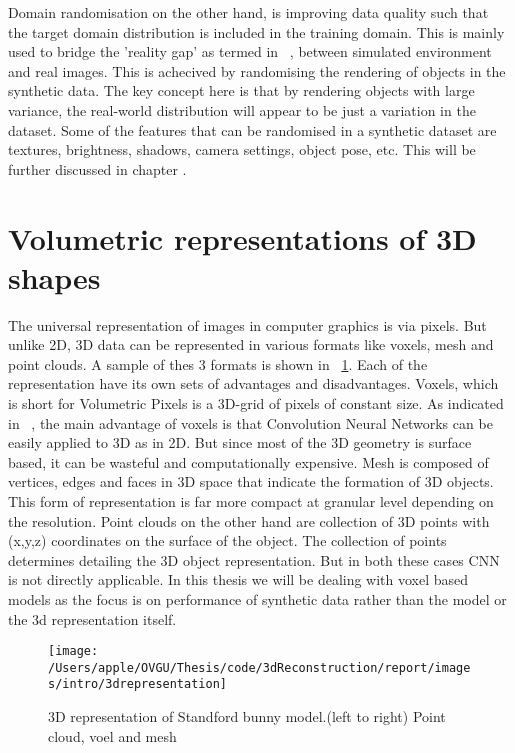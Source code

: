 Domain randomisation on the other hand, is improving data quality such that the target domain distribution is included in the training domain.
This is mainly used to bridge the 'reality gap' as termed in ~\cite{tobin2017domain}, between simulated environment and real images.
This is achecived by randomising the rendering of objects in the synthetic data.
The key concept here is that by rendering objects with large variance, the real-world distribution will appear to be just a variation in the dataset.
Some of the features that can be randomised in a synthetic dataset are textures, brightness, shadows, camera settings, object pose, etc. This will be further discussed in chapter .


\section{Volumetric representations of 3D shapes}
The universal representation of images in computer graphics is via pixels.
But unlike 2D, 3D data can be represented in various formats like voxels, mesh and point clouds. A sample of thes 3 formats is shown in ~\ref{fig:3d representation}.
Each of the representation have its own sets of advantages and disadvantages.
Voxels, which is short for Volumetric Pixels is a 3D-grid of pixels of constant size.
As indicated in ~\cite{li2016fpnn}, the main advantage of voxels is that Convolution Neural Networks can be easily applied to 3D as in 2D.
But since most of the 3D geometry is surface based, it can be wasteful and computationally expensive.
Mesh is composed of vertices, edges and faces in 3D space that indicate the formation of 3D objects.
This form of representation is far more compact at granular level depending on the resolution.
Point clouds on the other hand are collection of 3D points with (x,y,z) coordinates on the surface of the object.
The collection of points determines detailing the 3D object representation. But in both these cases CNN is not directly applicable.
In this thesis we will be dealing with voxel based models as the focus is on performance of synthetic data rather than the model or the 3d representation itself.

\begin{figure}
    \centering
    \texttt{[image: /Users/apple/OVGU/Thesis/code/3dReconstruction/report/images/intro/3drepresentation]}
    \caption{3D representation of Standford bunny model.(left to right) Point cloud, voel and mesh ~\cite{Hoang2019ADL}
    \label{fig:3d representation}}
\end{figure}
